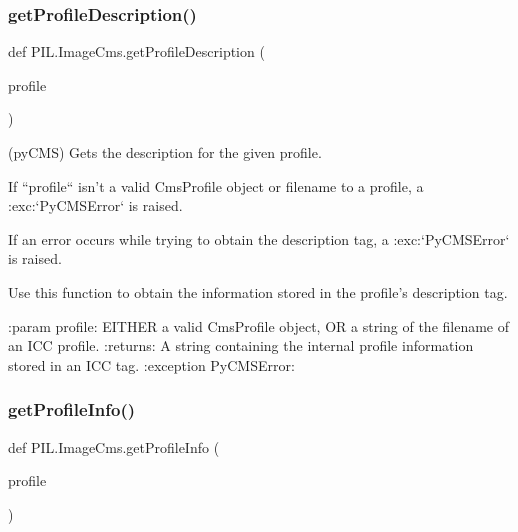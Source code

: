 \subsubsection{\texorpdfstring{get\+Profile\+Description()}{getProfileDescription()}}
{\footnotesize\ttfamily def P\+I\+L.\+Image\+Cms.\+get\+Profile\+Description (\begin{DoxyParamCaption}\item[{}]{profile }\end{DoxyParamCaption})}

\begin{DoxyVerb}(pyCMS) Gets the description for the given profile.

If ``profile`` isn't a valid CmsProfile object or filename to a profile, a
:exc:`PyCMSError` is raised.

If an error occurs while trying to obtain the description tag,
a :exc:`PyCMSError` is raised.

Use this function to obtain the information stored in the profile's
description tag.

:param profile: EITHER a valid CmsProfile object, OR a string of the
    filename of an ICC profile.
:returns: A string containing the internal profile information stored in an
    ICC tag.
:exception PyCMSError:
\end{DoxyVerb}
 \mbox{\label{namespacePIL_1_1ImageCms_aa57173c3e27bf505d24446b144766494}} 
\subsubsection{\texorpdfstring{get\+Profile\+Info()}{getProfileInfo()}}
{\footnotesize\ttfamily def P\+I\+L.\+Image\+Cms.\+get\+Profile\+Info (\begin{DoxyParamCaption}\item[{}]{profile }\end{DoxyParamCaption})}

